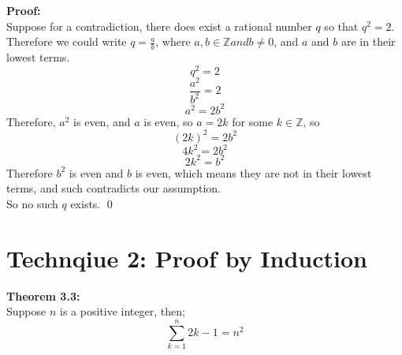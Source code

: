 \documentclass{report}
\newenvironment{frameblack}[1][Black]
  {\begin{tcolorbox}[colframe=#1,colback=white]}
  {\end{tcolorbox}}
\newenvironment{framered}[1][Maroon]
  {\begin{tcolorbox}[colframe=#1,colback=white]}
  {\end{tcolorbox}}
\begin{document}
\begin{frameblack}
    \textbf{Proof:}\\
    Suppose for a contradiction, there does exist a rational number $q$ so that $q^2 = 2$.\\
    Therefore we could write $q = \frac{a}{b}$, where $a,b \in \mathbb{Z} and b \neq 0$, and $a$ and $b$ are in their lowest terms.
    \begin{equation*}
        q^2 = 2
    \end{equation*}
    \begin{equation*}
        \frac{a^2}{b^2} = 2
    \end{equation*}
    \begin{equation*}
        a^2 = 2b^2
    \end{equation*}
    Therefore, $a^2$ is even, and $a$ is even, so $a = 2k$ for some $k \in \mathbb{Z}$, so
    \begin{equation*}
        (2k)^2 = 2b^2
    \end{equation*}
    \begin{equation*}
        4k^2 = 2b^2
    \end{equation*}
    \begin{equation*}
        2k^2 = b^2
    \end{equation*}
    Therefore $b^2$ is even and $b$ is even, which means they are not in their lowest terms, and such contradicts our assumption.\\
    So no such $q$ exists.
    \qed
\end{frameblack}

\section{Technqiue 2: Proof by Induction}

\begin{framered}
    \textbf{Theorem 3.3:}\\
    Suppose $n$ is a positive integer, then;
    \begin{equation*}
        \sum_{k=1}^n 2k-1 = n^2
    \end{equation*}
\end{framered}
\end{document}
